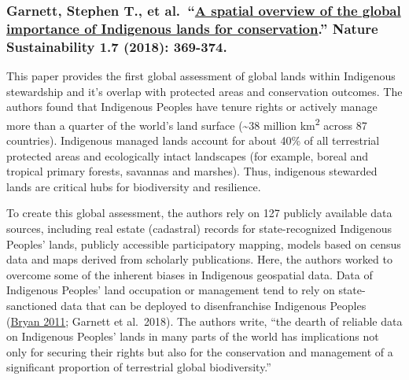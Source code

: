 \documentclass[
]{book}
\begin{document}
\hypertarget{garnett-stephen-t.-et-al.-a-spatial-overview-of-the-global-importance-of-indigenous-lands-for-conservation.-nature-sustainability-1.7-2018-369-374.}{%
\subsubsection*{\texorpdfstring{Garnett, Stephen T., et al.~``\href{https://www.nature.com/articles/s41893-018-0100-6?ss_source=sscampaigns\&ss_campaign_id=5c424fe9d20e280001eb02bf\&ss_email_id=5c5cf4c39bca21000175c9fd\&ss_campaign_name=Introducing+the+Interfaith+Rainforest+Initiative\&ss_campaign_sent_date=2019-02-08T03:17:24Z}{A spatial overview of the global importance of Indigenous lands for conservation}.'' Nature Sustainability 1.7 (2018): 369-374.}{Garnett, Stephen T., et al.~``A spatial overview of the global importance of Indigenous lands for conservation.'' Nature Sustainability 1.7 (2018): 369-374.}}\label{garnett-stephen-t.-et-al.-a-spatial-overview-of-the-global-importance-of-indigenous-lands-for-conservation.-nature-sustainability-1.7-2018-369-374.}}

This paper provides the first global assessment of global lands within Indigenous stewardship and it's overlap with protected areas and conservation outcomes. The authors found that Indigenous Peoples have tenure rights or actively manage more than a quarter of the world's land surface (\textasciitilde38 million km\textsuperscript{2} across 87 countries). Indigenous managed lands account for about 40\% of all terrestrial protected areas and ecologically intact landscapes (for example, boreal and tropical primary forests, savannas and marshes). Thus, indigenous stewarded lands are critical hubs for biodiversity and resilience.

To create this global assessment, the authors rely on 127 publicly available data sources, including real estate (cadastral) records for state-recognized Indigenous Peoples' lands, publicly accessible participatory mapping, models based on census data and maps derived from scholarly publications. Here, the authors worked to overcome some of the inherent biases in Indigenous geospatial data. Data of Indigenous Peoples' land occupation or management tend to rely on state-sanctioned data that can be deployed to disenfranchise Indigenous Peoples (\href{https://www.sciencedirect.com/science/article/pii/S0016718510001090?via\%3Dihub}{Bryan 2011}; Garnett et al.~2018). The authors write, ``the dearth of reliable data on Indigenous Peoples' lands in many parts of the world has implications not only for securing their rights but also for the conservation and management of a significant proportion of terrestrial global biodiversity.''
\end{document}
